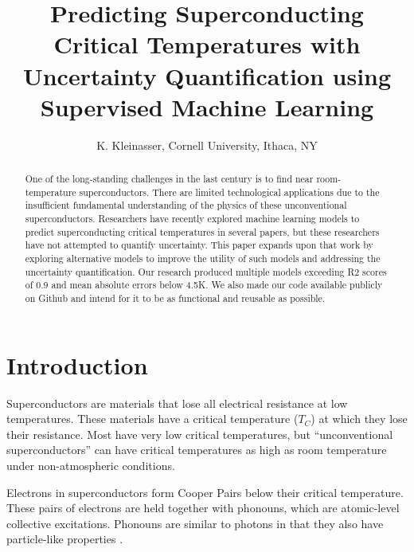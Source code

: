 \documentclass[twocolumn, nofootinbib, secnumarabic, amssymb, nobibnotes, aps, prd]{revtex4-2}
\begin{document}
\begin{abstract}
One of the long-standing challenges in the last century is to find near room-temperature superconductors. There are limited technological applications due to the insufficient fundamental understanding of the physics of these unconventional superconductors. Researchers have recently explored machine learning models to predict superconducting critical temperatures in several papers, but these researchers have not attempted to quantify uncertainty. This paper expands upon that work by exploring alternative models to improve the utility of such models and addressing the  uncertainty quantification. Our research produced multiple models exceeding R2 scores of 0.9 and mean absolute errors below 4.5K. We also made our code available publicly on Github and intend for it to be as functional and reusable as possible. 
\end{abstract}


\title{Predicting Superconducting Critical Temperatures with Uncertainty Quantification using Supervised Machine Learning}

\author{K. Kleinasser, Cornell University, Ithaca, NY}

\maketitle

\section{Introduction}
Superconductors are materials that lose all electrical resistance at low temperatures. These materials have a critical temperature ($T_C$) at which they lose their resistance. Most have very low critical temperatures, but “unconventional superconductors” can have critical temperatures as high as room temperature under non-atmospheric conditions. 

Electrons in superconductors form Cooper Pairs below their critical temperature. These pairs of electrons are held together with phonouns, which are atomic-level collective excitations. Phonouns are similar to photons in that they also have particle-like properties \cite{rohlf_1994, BussmannHolderKeller2020}.
\end{document}
